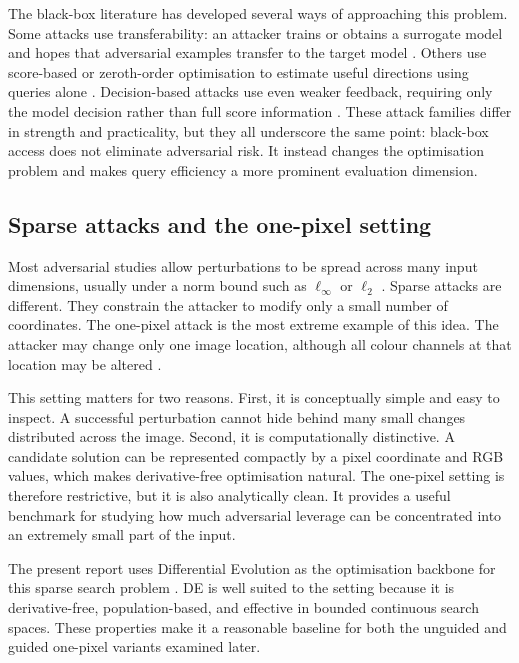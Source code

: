 The black-box literature has developed several ways of approaching this problem.
Some attacks use transferability: an attacker trains or obtains a surrogate model and hopes that adversarial examples transfer to the target model \cite{papernot2017practical}.
Others use score-based or zeroth-order optimisation to estimate useful directions using queries alone \cite{chen2017zoo}.
Decision-based attacks use even weaker feedback, requiring only the model decision rather than full score information \cite{brendel2018decision}.
These attack families differ in strength and practicality, but they all underscore the same point: black-box access does not eliminate adversarial risk.
It instead changes the optimisation problem and makes query efficiency a more prominent evaluation dimension.

\subsection{Sparse attacks and the one-pixel setting}
Most adversarial studies allow perturbations to be spread across many input dimensions, usually under a norm bound such as $\ell_\infty$ or $\ell_2$ \cite{madry2018towards}.
Sparse attacks are different.
They constrain the attacker to modify only a small number of coordinates.
The one-pixel attack is the most extreme example of this idea.
The attacker may change only one image location, although all colour channels at that location may be altered \cite{su2019onepixel}.

This setting matters for two reasons.
First, it is conceptually simple and easy to inspect.
A successful perturbation cannot hide behind many small changes distributed across the image.
Second, it is computationally distinctive.
A candidate solution can be represented compactly by a pixel coordinate and RGB values, which makes derivative-free optimisation natural.
The one-pixel setting is therefore restrictive, but it is also analytically clean.
It provides a useful benchmark for studying how much adversarial leverage can be concentrated into an extremely small part of the input.

The present report uses Differential Evolution as the optimisation backbone for this sparse search problem \cite{storn1997de}.
DE is well suited to the setting because it is derivative-free, population-based, and effective in bounded continuous search spaces.
These properties make it a reasonable baseline for both the unguided and guided one-pixel variants examined later.

